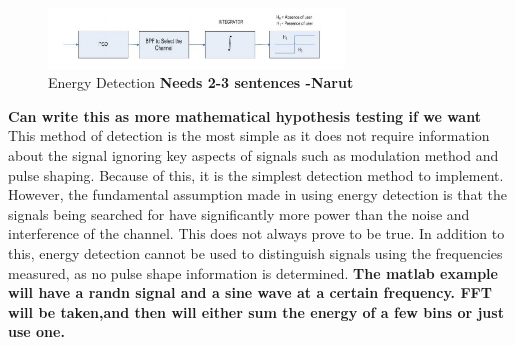\begin{figure}[ht]
\centering
\includegraphics[width=0.70\textwidth]{img/energy_detection.png}
\caption{Energy Detection \textbf{Needs 2-3 sentences -Narut}}
\label{fig:energy_detection}
\end{figure}\par

\textbf{Can write this as more mathematical hypothesis testing if we want}
This method of detection is the most simple as it does not require information about the signal ignoring key aspects of signals such as modulation method and pulse shaping. Because of this, it is the simplest detection method to implement. However, the fundamental assumption made in using energy detection is that the signals being searched for have significantly more power than the noise and interference of the channel. This does not always prove to be true. In addition to this, energy detection cannot be used to distinguish signals using the frequencies measured, as no pulse shape information is determined.
\textbf{The matlab example will have a randn signal and a sine wave at a certain frequency. FFT will be taken,and then will either sum the energy of a few bins or just use one.}

